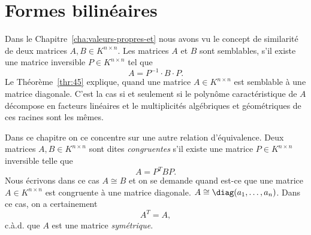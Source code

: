 \chapter{Formes bilinéaires}
\label{cha:prod-scal-et}


\noindent 
Dans le Chapitre~\ref{cha:valeurs-propres-et} nous avons vu le concept de similarité de deux matrices $A , B ∈K ^{n ×n}$. Les matrices $A$ et $B$ sont semblables, s'il existe une matrice  inversible $P ∈K^{n ×n}$ tel que
\begin{displaymath}
  A = P^{-1} ⋅B ⋅P. 
\end{displaymath}
Le Théorème~\ref{thr:45} explique, quand une matrice $A ∈ K^{n ×n}$ est semblable à une matrice diagonale. C'est la cas si et seulement si le polynôme caractéristique de $A$ décompose en facteurs linéaires et le multiplicités algébriques et géométriques   de ces racines sont les mêmes.

Dans ce chapitre on ce concentre sur une autre relation d'équivalence.  Deux matrices $A,B \in K^{n\times n}$ sont dites \emph{congruentes} s'il existe une matrice $P \in K^{n \times n}$ inversible telle que 
\begin{displaymath}
  A = P^T B P.
\end{displaymath}
Nous écrivons dans ce cas $A \cong B$ et on se demande quand est-ce que une matrice $A ∈ K^{n ×n}$ est congruente à une matrice diagonale. $A \cong \diag(a_1,\dots,a_n)$. Dans ce cas, on a certainement
\begin{displaymath}
  A^T = A, 
\end{displaymath}
c.à.d. que $A$ est une matrice \emph{symétrique}.

